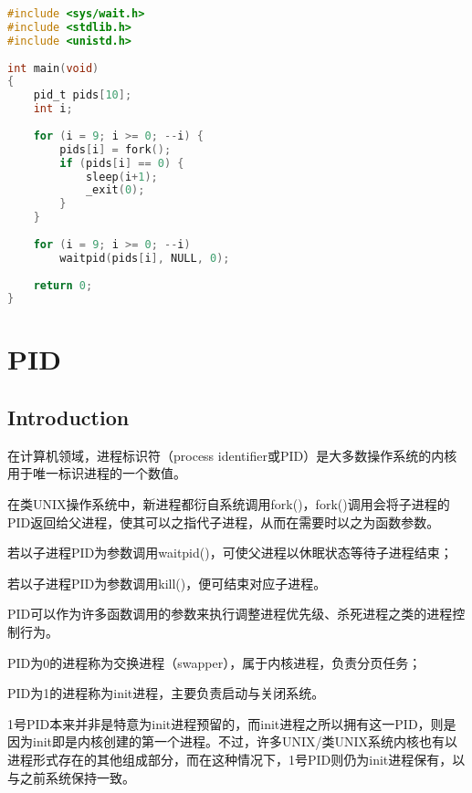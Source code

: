 \begin{lstlisting}[language=C]
#include <sys/wait.h>
#include <stdlib.h>
#include <unistd.h>
 
int main(void)
{
	pid_t pids[10];
	int i;
 
	for (i = 9; i >= 0; --i) {
		pids[i] = fork();
		if (pids[i] == 0) {
			sleep(i+1);
			_exit(0);
		}
	}
 
	for (i = 9; i >= 0; --i)
		waitpid(pids[i], NULL, 0);
 
	return 0;
}
\end{lstlisting}


\chapter{PID}


\section{Introduction}

在计算机领域，进程标识符（process identifier或PID）是大多数操作系统的内核用于唯一标识进程的一个数值。







在类UNIX操作系统中，新进程都衍自系统调用fork()，fork()调用会将子进程的PID返回给父进程，使其可以之指代子进程，从而在需要时以之为函数参数。

\begin{compactitem}
\item 若以子进程PID为参数调用waitpid()，可使父进程以休眠状态等待子进程结束；
\item 若以子进程PID为参数调用kill()，便可结束对应子进程。
\end{compactitem}

PID可以作为许多函数调用的参数来执行调整进程优先级、杀死进程之类的进程控制行为。

\begin{compactitem}
\item PID为0的进程称为交换进程（swapper），属于内核进程，负责分页任务；
\item PID为1的进程称为init进程，主要负责启动与关闭系统。
\end{compactitem}

1号PID本来并非是特意为init进程预留的，而init进程之所以拥有这一PID，则是因为init即是内核创建的第一个进程。不过，许多UNIX/类UNIX系统内核也有以进程形式存在的其他组成部分，而在这种情况下，1号PID则仍为init进程保有，以与之前系统保持一致。





